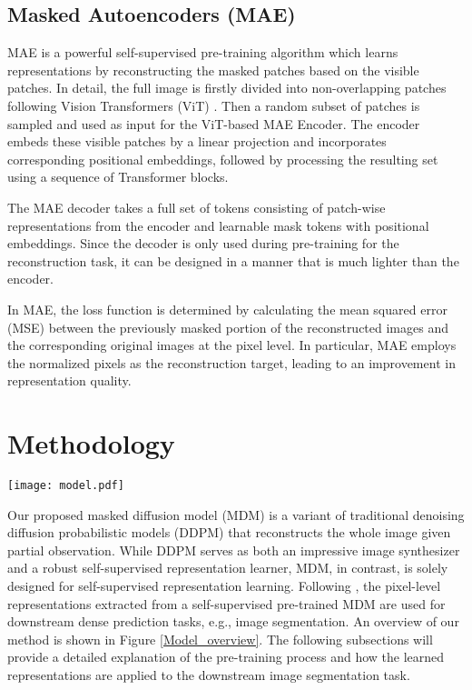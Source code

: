 \documentclass{article} \usepackage{iclr2024_conference,times}
\begin{document}
\subsection{Masked Autoencoders (MAE)} 

MAE is a powerful self-supervised pre-training algorithm which learns representations by reconstructing the masked patches based on the visible patches. In detail, the full image is firstly divided into non-overlapping patches following Vision Transformers (ViT) \citep{DBLP:conf/iclr/DosovitskiyB0WZ21}. Then a random subset of patches is sampled and used as input for the ViT-based MAE Encoder. The encoder embeds these visible patches by a linear projection and incorporates corresponding positional embeddings, followed by processing the resulting set using a sequence of Transformer blocks.

The MAE decoder takes a full set of tokens consisting of patch-wise representations from the encoder and learnable mask tokens with positional embeddings. Since the decoder is only used during pre-training for the reconstruction task, it can be designed in a manner that is much lighter than the encoder. 

In MAE, the loss function is determined by calculating the mean squared error (MSE) between the previously masked portion of the reconstructed images and the corresponding original images at the pixel level. In particular, MAE employs the normalized pixels as the reconstruction target, leading to an improvement in representation quality.



\section{Methodology}

\begin{figure*}[!tp]
\centering
\texttt{[image: model.pdf]} \caption{\textbf{Overview of our proposed method.} During pre-training, only the masked diffusion model (Encoder and Decoder) in Step 1 is trained. During downstream segmentation task, the pre-trained model in Step 1 is frozen as a representation generator and the segmentation network in Step 2 is trained with the representations from Step 1.}
\label{Model_overview}
\end{figure*}


Our proposed masked diffusion model (MDM) is a variant of traditional denoising diffusion probabilistic models (DDPM) that reconstructs the whole image given partial observation. While DDPM serves as both an impressive image synthesizer and a robust self-supervised representation learner, MDM, in contrast, is solely designed for self-supervised representation learning. Following \citet{DBLP:conf/iclr/BaranchukVRKB22}, the pixel-level representations extracted from a self-supervised pre-trained MDM are used for downstream dense prediction tasks, e.g., image segmentation. An overview of our method is shown in Figure \ref{Model_overview}. 
The following subsections will provide a detailed explanation of the pre-training process and how the learned representations are applied to the downstream image segmentation task.
\end{document}
